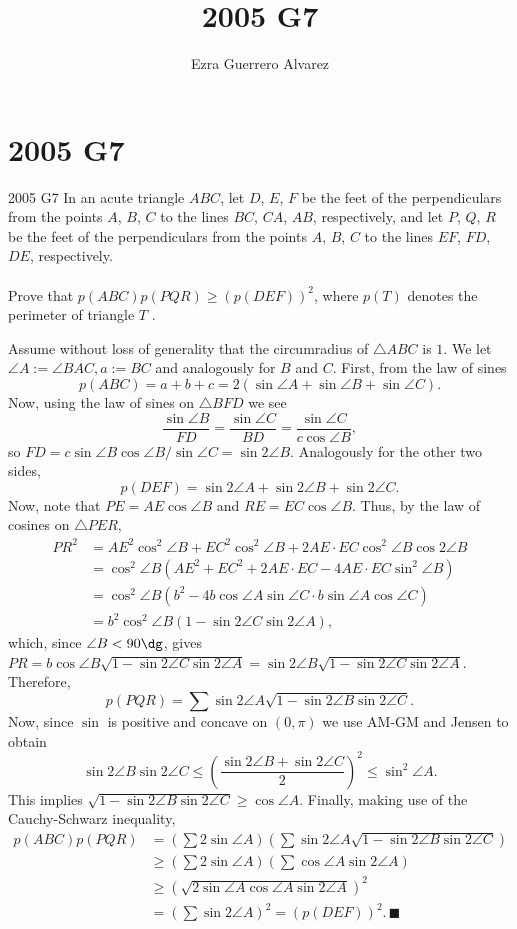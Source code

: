 \documentclass[14pt]{article}
\title{2005 G7}
\author{Ezra Guerrero Alvarez}
\begin{document}
\maketitle
	
\section*{2005 G7}

\begin{statement}{2005 G7}
	In an acute triangle $ABC$, let $D$, $E$, $F$ be the feet of the perpendiculars from the points $A$, $B$, $C$ to the lines $BC$, $CA$, $AB$, respectively, and let $P$, $Q$, $R$ be the feet of the perpendiculars from the points $A$, $B$, $C$ to the lines $EF$, $FD$, $DE$, respectively. \\\\
	Prove that $p\left(ABC\right)p\left(PQR\right) \ge \left(p\left(DEF\right)\right)^2$, where $p\left(T\right)$ denotes the perimeter of triangle $T$ .
\end{statement}
Assume without loss of generality that the circumradius of $\triangle ABC$ is $1$. We let $\angle A:=\angle BAC, a:=BC$ and analogously for $B$ and $C$. First, from the law of sines
\[ p(ABC)=a+b+c=2(\sin\angle A+\sin\angle B+\sin\angle C). \]
Now, using the law of sines on $\triangle BFD$ we see
\[\frac{\sin\angle B}{FD}=\frac{\sin\angle C}{BD}=\frac{\sin\angle C}{c\cos\angle B}, \]
so $FD=c\sin\angle B\cos\angle B/\sin\angle C=\sin2\angle B$. Analogously for the other two sides,
\[ p(DEF)=\sin2\angle A + \sin2\angle B + \sin2\angle C. \]
Now, note that $PE=AE\cos\angle B$ and $RE=EC\cos\angle B$. Thus, by the law of cosines on $\triangle PER$, 
\begin{align*}
	PR^2&=AE^2\cos^2\angle B+EC^2\cos^2\angle B+2AE\cdot EC\cos^2\angle B\cos2\angle B\\
	&=\cos^2\angle B(AE^2+EC^2+2AE\cdot EC-4AE\cdot EC\sin^2\angle B)\\
	&=\cos^2\angle B(b^2-4b\cos\angle A\sin\angle C\cdot b\sin\angle A\cos\angle C)\\
	&=b^2\cos^2\angle B(1-\sin2\angle C\sin2\angle A),
\end{align*}
which, since $\angle B<90\dg$, gives $PR=b\cos\angle B\sqrt{1-\sin2\angle C\sin2\angle A}=\sin2\angle B\sqrt{1-\sin2\angle C\sin2\angle A}$. Therefore,
\[ p(PQR)=\sum\sin2\angle A\sqrt{1-\sin2\angle B\sin2\angle C}. \]
Now, since $\sin$ is positive and concave on $(0,\pi)$ we use AM-GM and Jensen to obtain
\[ \sin2\angle B\sin2\angle C\le\left(\frac{\sin2\angle B+\sin2\angle C}2\right)^2\le\sin^2\angle A. \]
This implies $\sqrt{1-\sin2\angle B\sin2\angle C}\ge\cos\angle A$. Finally, making use of the Cauchy-Schwarz inequality,
\begin{align*}
	p(ABC)p(PQR)&=\left(\sum2\sin\angle A\right)\left(\sum\sin2\angle A\sqrt{1-\sin2\angle B\sin2\angle C}\right)\\
	&\ge\left(\sum2\sin\angle A\right)\left(\sum\cos\angle A\sin2\angle A\right)\\
	&\ge\left(\sqrt{2\sin\angle A\cos\angle A\sin2\angle A}\right)^2\\
	&=\left(\sum\sin2\angle A\right)^2=(p(DEF))^2.\,\blacksquare
\end{align*}
	
\end{document}
